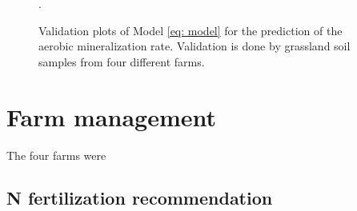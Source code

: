 \documentclass[10pt,twoside,dutch,english]{report}
\begin{document}
\begin{figure}
  \label{fig:val_pm}
\quad
{}
  \label{fig:val_ncum}
\caption{Validation plots of Model \ref{eq: model} for the prediction of the aerobic mineralization rate. Validation is done by grassland soil samples from four different farms.}. 
\label{fig:results_val}		
\end{figure}


	

	
	
\section{Farm management}
The four farms were 

\subsection{N fertilization recommendation}
\end{document}
